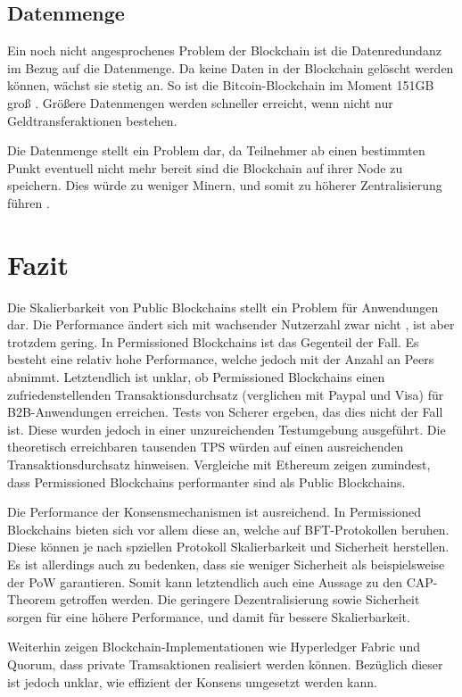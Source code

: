 \subsection{Datenmenge}
Ein noch nicht angesprochenes Problem der Blockchain ist die Datenredundanz im Bezug auf die Datenmenge. Da keine Daten in der Blockchain gelöscht werden können, wächst sie stetig an. So ist die Bitcoin-Blockchain im Moment 151GB groß \cite{BlockchainUnternehmenBlockchainSizeBitcoin}. Größere Datenmengen werden schneller erreicht, wenn nicht nur Geldtransferaktionen bestehen.

Die Datenmenge stellt ein Problem dar, da Teilnehmer ab einen bestimmten Punkt eventuell nicht mehr bereit sind die Blockchain auf ihrer Node zu speichern. Dies würde zu weniger Minern, und somit zu höherer Zentralisierung führen \cite{SchererPerformanceScalabilityBlockchain2017}.

\section{Fazit}
Die Skalierbarkeit von Public Blockchains stellt ein Problem für Anwendungen dar. Die Performance ändert sich mit wachsender Nutzerzahl zwar nicht \cite{SchererPerformanceScalabilityBlockchain2017}, ist aber trotzdem gering. In Permissioned Blockchains ist das Gegenteil der Fall. Es besteht eine relativ hohe Performance, welche jedoch mit der Anzahl an Peers abnimmt. Letztendlich ist unklar, ob Permissioned Blockchains einen zufriedenstellenden Transaktionsdurchsatz (verglichen mit Paypal und Visa) für B2B-Anwendungen erreichen. Tests von Scherer ergeben, das dies nicht der Fall ist. Diese wurden jedoch in einer unzureichenden Testumgebung ausgeführt. Die theoretisch erreichbaren tausenden TPS würden auf einen ausreichenden Transaktionsdurchsatz hinweisen. Vergleiche mit Ethereum zeigen zumindest, dass Permissioned Blockchains performanter sind als Public Blockchains.

Die Performance der Konsensmechanismen ist ausreichend. In Permissioned Blockchains bieten sich vor allem diese an, welche auf BFT-Protokollen beruhen. Diese können je nach spziellen Protokoll Skalierbarkeit und Sicherheit herstellen. Es ist allerdings auch zu bedenken, dass sie weniger Sicherheit als beispielsweise der PoW garantieren. Somit kann letztendlich auch eine Aussage zu den CAP-Theorem getroffen werden. Die geringere Dezentralisierung sowie Sicherheit sorgen für eine höhere Performance, und damit für bessere Skalierbarkeit.

Weiterhin zeigen Blockchain-Implementationen wie Hyperledger Fabric und Quorum, dass private Tramsaktionen realisiert werden können. Bezüglich dieser ist jedoch unklar, wie effizient der Konsens umgesetzt werden kann.





